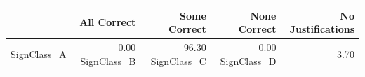 \begin{tabular}{lrrrr}
\toprule
 & All Correct & Some Correct & None Correct & No Justifications \\
\midrule
SignClass_A & 0.00%
SignClass_B & 96.30%
SignClass_C & 0.00%
SignClass_D & 3.70%
\bottomrule
\end{tabular}
